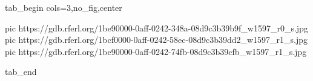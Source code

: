  
 
 
 
 

\ifcmt
  tab_begin cols=3,no_fig,center

     pic https://gdb.rferl.org/1be90000-0aff-0242-348a-08d9c3b39b9f_w1597_r0_s.jpg
		 pic https://gdb.rferl.org/1bcf0000-0aff-0242-58ec-08d9c3b39dd2_w1597_r1_s.jpg
		 pic https://gdb.rferl.org/1be90000-0aff-0242-74fb-08d9c3b39cfb_w1597_r1_s.jpg

  tab_end
\fi
